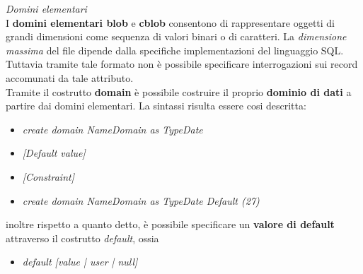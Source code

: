 \documentclass{article}
\begin{document}
\textit{Domini elementari}\\ I \textbf{domini elementari blob} e \textbf{cblob} consentono di rappresentare oggetti di grandi dimensioni come sequenza di valori binari o di caratteri. La \textit{dimensione massima} del file dipende dalla specifiche implementazioni del linguaggio SQL. Tuttavia tramite tale formato non è possibile specificare interrogazioni sui record accomunati da tale attributo.\vspace*{14pt}\\
Tramite il costrutto \textbf{domain} è possibile costruire il proprio \textbf{dominio di dati} a partire dai domini elementari. La sintassi risulta essere cosi descritta:
\begin{itemize}[label={ }, leftmargin=1cm]
    \item \textit{create domain NameDomain as TypeDate}
\end{itemize}
\begin{itemize}[label={ }, leftmargin=2cm]
    \itemsep0em
    \item \textit{[Default value]}
    \item \textit{[Constraint]}
\end{itemize}
\begin{itemize}[label={ }, leftmargin=1cm]
    \item \textit{create domain NameDomain as TypeDate Default (27)}  
\end{itemize}
inoltre rispetto a quanto detto, è possibile specificare un \textbf{valore di default} attraverso il costrutto \textit{default}, ossia
\begin{itemize}[label={ }, leftmargin=1cm]
    \item \textit{default [value | user | null]}
\end{itemize}
\end{document}
